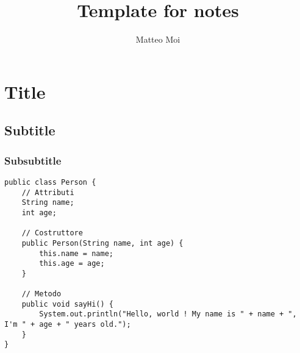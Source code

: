 \documentclass[a4paper, 12pt]{article}
\begin{document}
    \title{Template for notes}
    \author{Matteo Moi}
    \date{}
    \maketitle

    \tableofcontents
    \newpage

    \section{Title}

    \subsection{Subtitle}

    \subsubsection{Subsubtitle}

    \begin{lstlisting}
public class Person {
    // Attributi
    String name;
    int age;

    // Costruttore
    public Person(String name, int age) {
        this.name = name;
        this.age = age;
    }

    // Metodo
    public void sayHi() {
        System.out.println("Hello, world ! My name is " + name + ", I'm " + age + " years old.");
    }
}
    \end{lstlisting}
\end{document}
